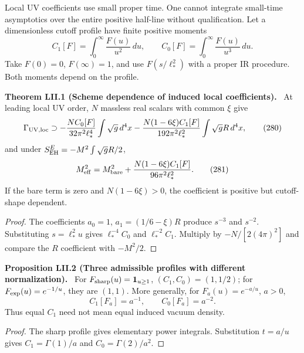 \documentclass[11pt,a4paper,oneside]{book}
\newcommand{\one}{\mathbf 1}\newcommand{\ii}{\mathrm i}\newcommand{\dd}{\mathrm d}
\newcommand{\statement}[3]{\par\medskip\noindent\textbf{#1 #2 (#3).}\ }
\begin{document}
Local UV coefficients use small proper time. One cannot integrate small-time asymptotics over the entire positive half-line without qualification. Let a dimensionless cutoff profile have finite positive moments
\begin{equation}C_1[F]=\int_0^\infty\frac{F(u)}{u^2}\,du,\qquad C_0[F]=\int_0^\infty\frac{F(u)}{u^3}\,du.\tag{279}\end{equation}
Take $F(0)=0$, $F(\infty)=1$, and use $F(s/\ell_*^2)$ with a proper IR procedure. Both moments depend on the profile.
\statement{Theorem}{LII.1}{Scheme dependence of induced local coefficients}
At leading local UV order, $N$ massless real scalars with common $\xi$ give
\begin{equation}\Gamma_{\rm UV,loc}\supset-\frac{NC_0[F]}{32\pi^2\ell_*^4}\int\sqrt g\,d^4x-\frac{N(1-6\xi)C_1[F]}{192\pi^2\ell_*^2}\int\sqrt gR\,d^4x,\tag{280}\end{equation}
and under $S^E_{\rm EH}=-M^2\int\sqrt gR/2$,
\begin{equation}M_{\rm eff}^2=M_{\rm bare}^2+\frac{N(1-6\xi)C_1[F]}{96\pi^2\ell_*^2}.\tag{281}\end{equation}
If the bare term is zero and $N(1-6\xi)>0$, the coefficient is positive but cutoff-shape dependent.
\begin{proof}
The coefficients $a_0=1$, $a_1=(1/6-\xi)R$ produce $s^{-3}$ and $s^{-2}$. Substituting $s=\ell_*^2u$ gives $\ell_*^{-4}C_0$ and $\ell_*^{-2}C_1$. Multiply by $-N/[2(4\pi)^2]$ and compare the $R$ coefficient with $-M^2/2$.
\end{proof}
\statement{Proposition}{LII.2}{Three admissible profiles with different normalization}
For $F_{\rm sharp}(u)=\one_{u\ge1}$, $(C_1,C_0)=(1,1/2)$; for $F_{\rm exp}(u)=e^{-1/u}$, they are $(1,1)$. More generally, for $F_a(u)=e^{-a/u}$, $a>0$,
\begin{equation}C_1[F_a]=a^{-1},\qquad C_0[F_a]=a^{-2}.\tag{282}\end{equation}
Thus equal $C_1$ need not mean equal induced vacuum density.
\begin{proof}
The sharp profile gives elementary power integrals. Substitution $t=a/u$ gives $C_1=\Gamma(1)/a$ and $C_0=\Gamma(2)/a^2$.
\end{proof}
\end{document}
